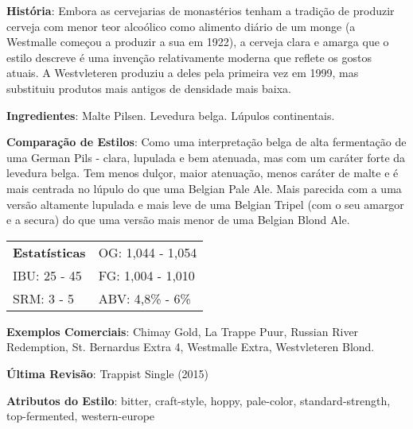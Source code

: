 \textbf{História}: Embora as cervejarias de monastérios tenham a tradição de produzir cerveja com menor teor alcoólico como alimento diário de um monge (a Westmalle começou a produzir a sua em 1922), a cerveja clara e amarga que o estilo descreve é uma invenção relativamente moderna que reflete os gostos atuais. A Westvleteren produziu a deles pela primeira vez em 1999, mas substituiu produtos mais antigos de densidade mais baixa.

\textbf{Ingredientes}: Malte Pilsen. Levedura belga. Lúpulos continentais.

\textbf{Comparação de Estilos}: Como uma interpretação belga de alta fermentação de uma German Pils - clara, lupulada e bem atenuada, mas com um caráter forte da levedura belga. Tem menos dulçor, maior atenuação, menos caráter de malte e é mais centrada no lúpulo do que uma Belgian Pale Ale. Mais parecida com a uma versão altamente lupulada e mais leve de uma Belgian Tripel (com o seu amargor e a secura) do que uma versão mais menor de uma Belgian Blond Ale.

\begin{tabular}{@{}p{35mm}p{35mm}@{}}
  \textbf{Estatísticas} & OG: 1,044 - 1,054 \\
  IBU: 25 - 45  & FG: 1,004 - 1,010  \\
  SRM: 3 - 5  & ABV: 4,8\% - 6\%
\end{tabular}

\textbf{Exemplos Comerciais}: Chimay Gold, La Trappe Puur, Russian River Redemption, St. Bernardus Extra 4, Westmalle Extra, Westvleteren Blond.

\textbf{Última Revisão}: Trappist Single (2015)

\textbf{Atributos do Estilo}: bitter, craft-style, hoppy, pale-color, standard-strength, top-fermented, western-europe
